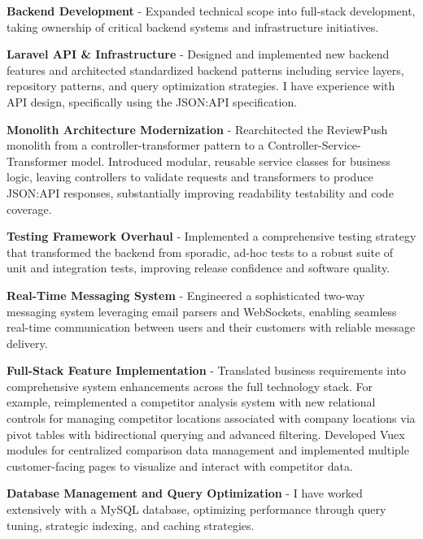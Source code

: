 \begin{cventries}
{\begin{cvitems}
            \item {\textbf{Backend Development} - Expanded technical scope into full-stack development, taking ownership of critical backend systems and infrastructure initiatives.}
        \end{cvitems}
        \begin{cvsubitems}
            \item {\textbf{Laravel API \& Infrastructure} - Designed and implemented new backend features and architected standardized backend patterns including service layers, repository patterns, and query optimization strategies. I have experience with API design, specifically using the JSON:API specification.}
            \item {\textbf{Monolith Architecture Modernization} - Rearchitected the ReviewPush monolith from a controller-transformer pattern to a Controller-Service-Transformer model. Introduced modular, reusable service classes for business logic, leaving controllers to validate requests and transformers to produce JSON:API responses, substantially improving readability testability and code coverage.}
            \item {\textbf{Testing Framework Overhaul} - Implemented a comprehensive testing strategy that transformed the backend from sporadic, ad-hoc tests to a robust suite of unit and integration tests, improving release confidence and software quality.}
            \item {\textbf{Real-Time Messaging System} - Engineered a sophisticated two-way messaging system leveraging email parsers and WebSockets, enabling seamless real-time communication between users and their customers with reliable message delivery.}
            \item {\textbf{Full-Stack Feature Implementation} - Translated business requirements into comprehensive system enhancements across the full technology stack. For example, reimplemented a competitor analysis system with new relational controls for managing competitor locations associated with company locations via pivot tables with bidirectional querying and advanced filtering. Developed Vuex modules for centralized comparison data management and implemented multiple customer-facing pages to visualize and interact with competitor data.}
            \item {\textbf{Database Management and Query Optimization} - I have worked extensively with a MySQL database, optimizing performance through query tuning, strategic indexing, and caching strategies.}

\end{cvsubitems}}
\end{cventries}
